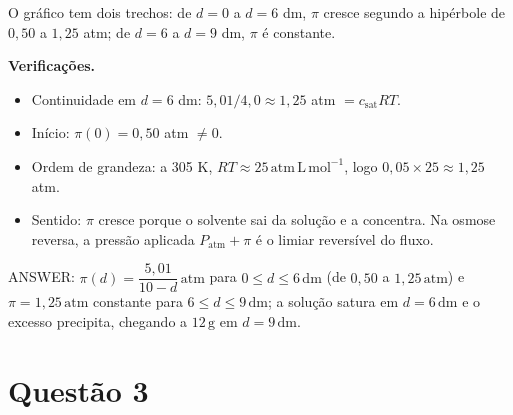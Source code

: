 \documentclass{article}%
\begin{document}
\pgfplotsset{compat=1.18, /pgf/number format/use comma}
\begin{center}
\end{center}

O gráfico tem dois trechos: de $d=0$ a $d=6$ dm, $\pi$ cresce segundo a hipérbole de $0{,}50$ a $1{,}25$ atm; de $d=6$ a $d=9$ dm, $\pi$ é constante.

\textbf{Verificações.}
\begin{itemize}
\item Continuidade em $d=6$ dm: $5{,}01/4{,}0\approx 1{,}25$ atm $=c_{\mathrm{sat}}RT$.
\item Início: $\pi(0)=0{,}50$ atm $\neq 0$.
\item Ordem de grandeza: a 305 K, $RT\approx 25\,\mathrm{atm\,L\,mol^{-1}}$, logo $0{,}05\times 25\approx 1{,}25$ atm.
\item Sentido: $\pi$ cresce porque o solvente sai da solução e a concentra. Na osmose reversa, a pressão aplicada $P_{\mathrm{atm}}+\pi$ é o limiar reversível do fluxo.
\end{itemize}

ANSWER: $\pi(d)=\dfrac{5{,}01}{10-d}\,\mathrm{atm}$ para $0\le d\le 6\,\mathrm{dm}$ (de $0{,}50$ a $1{,}25\,\mathrm{atm}$) e $\pi=1{,}25\,\mathrm{atm}$ constante para $6\le d\le 9\,\mathrm{dm}$; a solução satura em $d=6\,\mathrm{dm}$ e o excesso precipita, chegando a $12\,\mathrm{g}$ em $d=9\,\mathrm{dm}$.%
\newpage%
\section*{Questão 3}
\end{document}
